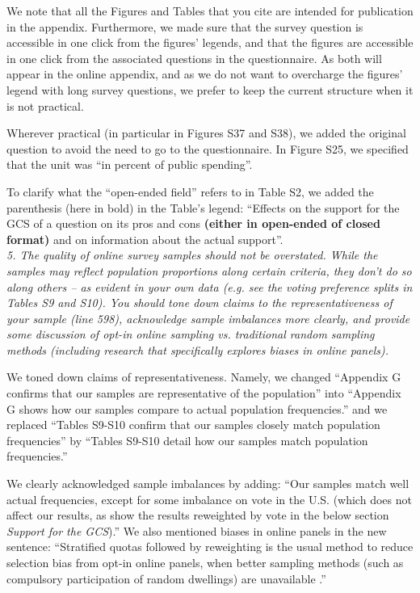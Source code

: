 \documentclass[12pt,english]{article}
\begin{document}
We note that all the Figures and Tables that you cite are intended for publication in the appendix. Furthermore, we made sure that the survey question is accessible in one click from the figures' legends, and that the figures are accessible in one click from the associated questions in the questionnaire. As both will appear in the online appendix, and as we do not want to overcharge the figures' legend with long survey questions, we prefer to keep the current structure when it is not practical. 

Wherever practical (in particular in Figures S37 and S38), we added the original question to avoid the need to go to the questionnaire. %
In Figure S25, we specified that the unit was ``in percent of public spending''.

To clarify what the ``open-ended field'' refers to in Table S2, %
we added the parenthesis (here in bold) in the Table's legend: ``Effects on the support for the GCS of a question on its pros and cons \textbf{(either in open-ended of closed format)} and on information about the actual support''.
~\\

\textit{5. The quality of online survey samples should not be overstated. While the samples may reflect population proportions along certain criteria, they don’t do so along others – as evident in your own data (e.g. see the voting preference splits in Tables S9 and S10). You should tone down claims to the representativeness of your sample (line 598), acknowledge sample imbalances more clearly, and provide some discussion of opt-in online sampling vs. traditional random sampling methods (including research that specifically explores biases in online panels).}

We toned down claims of representativeness. Namely, we changed ``Appendix G confirms that our samples are representative of the population'' into ``Appendix G shows how our samples compare to actual population frequencies.'' and we replaced ``Tables S9-S10 confirm that our samples closely match population frequencies'' by ``Tables S9-S10 %
detail how our samples match population frequencies.'' 

We clearly acknowledged sample imbalances by adding: ``Our samples match well actual frequencies, except for some imbalance on vote in the U.S. (which does not affect our results, as show the results reweighted by vote in the below section \textit{Support for the GCS}).'' We also mentioned biases in online panels in the new sentence: ``Stratified quotas followed by reweighting is the usual method to reduce selection bias from opt-in online panels, when better sampling methods (such as compulsory participation of random dwellings) are unavailable \citep{scherpenzeel_how_2010}.''
~\\
\end{document}
